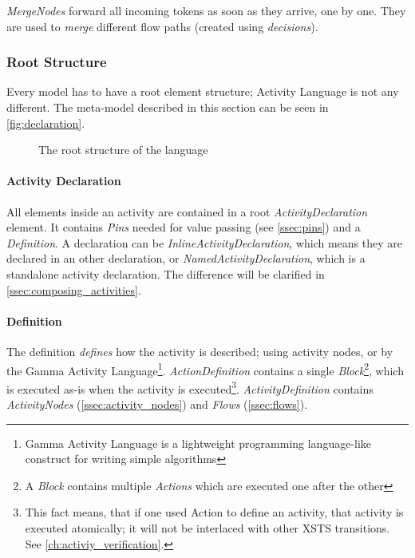 \emph{MergeNodes} forward all incoming tokens as soon as they arrive, one by one. They are used to \emph{merge} different flow paths (created using \emph{decisions}).

\subsubsection{Root Structure}\label{ssec:root_structure}

Every model has to have a root element structure; Activity Language is not any different. The meta-model described in this section can be seen in \autoref{fig:declaration}.

\begin{figure}[!ht]
	\centering
	
	\caption{The root structure of the language}
	\label{fig:declaration}
\end{figure}

\paragraph{Activity Declaration}\label{par:activity_declaration}

All elements inside an activity are contained in a root \emph{ActivityDeclaration} element. It contains \emph{Pins} needed for value passing (see \autoref{ssec:pins}) and a \emph{Definition}. A declaration can be \emph{InlineActivityDeclaration}, which means they are declared in an other declaration, or \emph{NamedActivityDeclaration}, which is a standalone activity declaration. The difference will be clarified in \autoref{ssec:composing_activities}.

\paragraph{Definition}\label{par:definition}

The definition \emph{defines} how the activity is described; using activity nodes, or by the Gamma Activity Language\footnote{Gamma Activity Language is a lightweight programming language-like construct for writing simple algorithms}. \emph{ActionDefinition} contains a single \emph{Block}\footnote{A \emph{Block} contains multiple \emph{Actions} which are executed one after the other}, which is executed as-is when the activity is executed\footnote{This fact means, that if one used Action to define an activity, that activity is executed atomically; it will not be interlaced with other XSTS transitions. See \autoref{ch:activiy_verification}.}. \emph{ActivityDefinition} contains \emph{ActivityNodes} (\autoref{ssec:activity_nodes}) and \emph{Flows} (\autoref{ssec:flows}).

